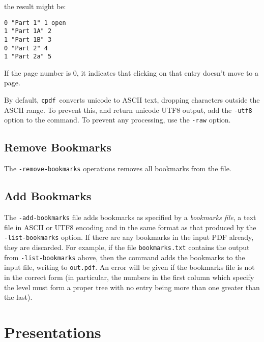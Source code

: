 \documentclass{book}
\newcommand{\cpdf}{\texttt{cpdf}}
\begin{document}
\noindent the result might be:

\begin{verbatim}
0 "Part 1" 1 open
1 "Part 1A" 2
1 "Part 1B" 3
0 "Part 2" 4
1 "Part 2a" 5\end{verbatim}

\noindent If the page number is 0, it indicates that clicking on that entry doesn't move to a page.

By default, \cpdf\ converts unicode to ASCII text, dropping characters outside
the ASCII range. To prevent this, and return unicode UTF8 output, add the
\texttt{-utf8} option to the command. To prevent any processing, use the
\texttt{-raw} option.

  \section{Remove Bookmarks}
  \label{removebookmarks}
  The \texttt{-remove-bookmarks} operations removes all bookmarks from the file.
\noindent{}

  \section{Add Bookmarks}
  
  The \texttt{-add-bookmarks} file adds bookmarks as specified by a
\textit{bookmarks file}, a text file in ASCII or UTF8 encoding and in the same format as that produced by the
\texttt{-list-bookmarks} option. If there are any bookmarks in the input PDF
already, they are discarded. For example, if the file \texttt{bookmarks.txt}
contains the output from \texttt{-list-bookmarks} above, then the command
\noindent{}
\noindent adds the bookmarks to the input file, writing to \texttt{out.pdf}. An error
will be given if the bookmarks file is not in the correct form (in particular,
the numbers in the first column which specify the level must form a proper
tree with no entry being more than one greater than the last).

\chapter{Presentations}
\end{document}
